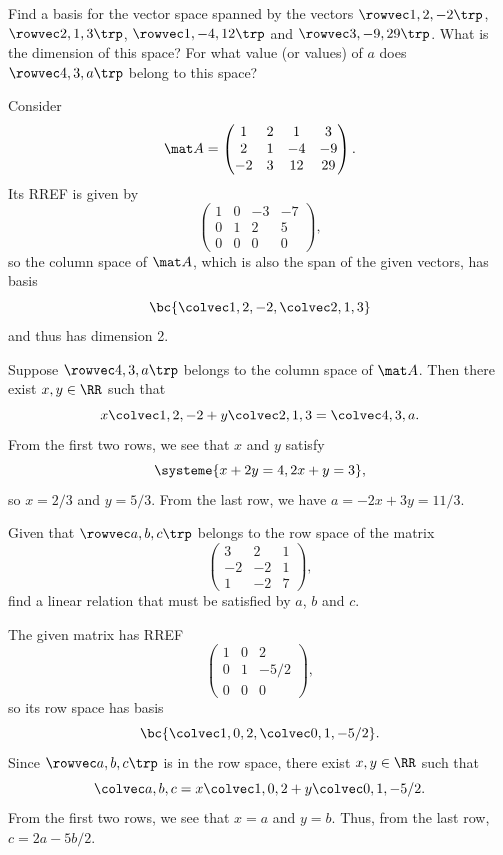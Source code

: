 \begin{problem}
    Find a basis for the vector space spanned by the vectors $\cveciiix12{-2}$, $\cveciiix213$, $\cveciiix1{-4}{12}$ and $\cveciiix3{-9}{29}$. What is the dimension of this space? For what value (or values) of $a$ does $\cveciiix43a$ belong to this space?
\end{problem}
\begin{ppart}
    Consider \[\mat A = \begin{pmatrix}1 & 2 & 1 & 3 \\ 2 & 1 & -4 & -9 \\ -2 & 3 & 12 & 29\end{pmatrix}.\] Its RREF is given by \[\begin{pmatrix}1 & 0 & -3 & -7 \\ 0 & 1 & 2 & 5 \\ 0 & 0 & 0 & 0\end{pmatrix},\] so the column space of $\mat A$, which is also the span of the given vectors, has basis \[\bc{\cveciii12{-2}, \cveciii213}\] and thus has dimension 2.

    Suppose $\cveciiix43a$ belongs to the column space of $\mat A$. Then there exist $x, y \in \RR$ such that \[x \cveciii12{-2} + y \cveciii213 = \cveciii43a.\] From the first two rows, we see that $x$ and $y$ satisfy \[\systeme{x + 2y = 4, 2x + y = 3},\] so $x = 2/3$ and $y = 5/3$. From the last row, we have $a = -2x + 3y = 11/3$.
\end{ppart}

\begin{problem}
    Given that $\cveciiix{a}{b}{c}$ belongs to the row space of the matrix \[\begin{pmatrix}3 & 2 & 1 \\ -2 & -2 & 1 \\ 1 & -2 & 7\end{pmatrix},\] find a linear relation that must be satisfied by $a$, $b$ and $c$.
\end{problem}
\begin{solution}
    The given matrix has RREF \[\begin{pmatrix}1 & 0 & 2 \\ 0 & 1 & -5/2 \\ 0 & 0 & 0\end{pmatrix},\] so its row space has basis \[\bc{\cveciii102, \cveciii01{-5/2}}.\] Since $\cveciiix{a}{b}{c}$ is in the row space, there exist $x, y \in \RR$ such that \[\cveciii{a}{b}{c} = x \cveciii102 + y \cveciii01{-5/2}.\] From the first two rows, we see that $x = a$ and $y = b$. Thus, from the last row, $c = 2a - 5b/2$.
\end{solution}

